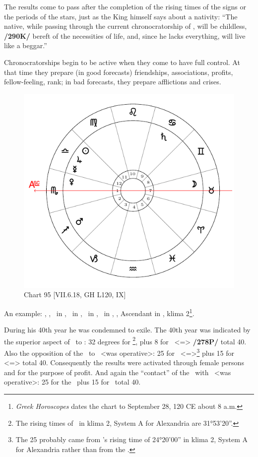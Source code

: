 The \mndl results come to pass after the completion of the rising times of the signs or the periods of the stars, just as the King himself says about a nativity: “The native, while passing through the current
chronocratorship of \Venus, will be childless, \textbf{/290K/} bereft of the necessities of life, and, since he lacks everything, will live like a beggar.” 

Chronocratorships begin to be active when they come to have full
control. At that time they prepare (in good forecasts) friendships, associations, profits, fellow-feeling, rank; in bad forecasts, they prepare afflictions and crises.

\begin{figure}
\centering
\vspace{-1em}
\includegraphics[width=.68\textwidth]{charts/7_6_18}
\caption{Chart 95 [VII.6.18, GH L120, IX] }
\label{fig:chart95}
\end{figure} 

An example: \Sun, \Jupiter, \Mercury\, in \Libra, \Moon\, in \Taurus, \Saturn\, in \Cancer, \Mars\, in \Sagittarius,
\Venus, Ascendant in \Scorpio, klima 2\footnote{\textit{Greek Horoscopes} dates the chart to September 28, 120 CE about 8 a.m.}.

During his 40th year he was condemned to exile. The 40th year
was indicated by the superior aspect of \Saturn\, to \Libra: 32 degrees for \Cancer\footnote{The rising times of \Cancer\, in klima 2, System A for Alexandria are 31°53'20''.}, plus 8 for \Libra\, <=\Venus> \textbf{/278P/} total 40. Also the opposition of the \Moon\, to \Venus\, <was operative>: 25 for \Taurus\, <=\Moon>\footnote{The 25 probably came from \Taurus's rising time of 24°20'00'' in klima 2, System A for Alexandria rather than from the \Moon.} plus 15 for \Scorpio\, <=\Mars> total 40. Consequently the results were activated through female persons and
for the purpose of profit. And again the “contact” of the \Moon\, with \Mars\, <was operative>: 25 for the \Moon\, plus 15 for \Mars\, total 40.

